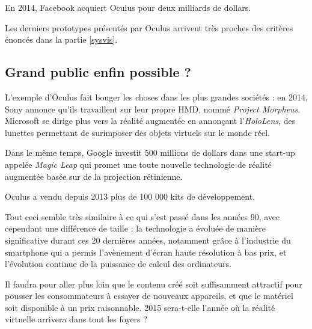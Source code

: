 \documentclass[a4,12pt]{scrartcl}
\begin{document}
En 2014, Facebook acquiert Oculus pour deux milliards de dollars.

Les derniers prototypes présentés par Oculus arrivent très proches des critères énoncés dans la partie \ref{sysvis}.

\subsection{Grand public enfin possible ?}

L'exemple d'Oculus fait bouger les choses dans les plus grandes sociétés : en 2014, Sony annonce qu'ils travaillent sur leur propre HMD, nommé \emph{Project Morpheus}. Microsoft se dirige plus vers la réalité augmentée en annonçant l'\emph{HoloLens}, des lunettes permettant de surimposer des objets virtuels sur le monde réel.

Dans le même temps, Google investit 500 millions de dollars dans une start-up appelée \emph{Magic Leap} qui promet une toute nouvelle technologie de réalité augmentée basée sur de la projection rétinienne.

Oculus a vendu depuis 2013 plus de 100 000 kits de développement.



Tout ceci semble très similaire à ce qui s'est passé dans les années 90, avec cependant une différence de taille : la technologie a évoluée de manière significative durant ces 20 dernières années, notamment grâce à l'industrie du smartphone qui a permis l'avènement d'écran haute résolution à bas prix, et l'évolution continue de la puissance de calcul des ordinateurs.

Il faudra pour aller plus loin que le contenu créé soit suffisamment attractif pour pousser les consommateurs à essayer de nouveaux appareils, et que le matériel soit disponible à un prix raisonnable. 2015 sera-t-elle l'année où la réalité virtuelle arrivera dans tout les foyers ?

\newpage


\end{document}
